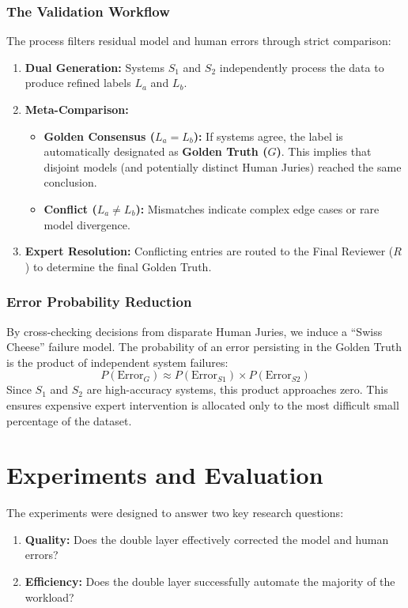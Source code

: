 \subsubsection{The Validation Workflow}
The process filters residual model and human errors through strict comparison:
\begin{enumerate}
    \item \textbf{Dual Generation:} Systems $S_1$ and $S_2$ independently process the data to produce refined labels $L_a$ and $L_b$.
    \item \textbf{Meta-Comparison:}
    \begin{itemize}
        \item \textbf{Golden Consensus ($L_a = L_b$):} If systems agree, the label is automatically designated as \textbf{Golden Truth ($G$)}. This implies that disjoint models (and potentially distinct Human Juries) reached the same conclusion.
        \item \textbf{Conflict ($L_a \neq L_b$):} Mismatches indicate complex edge cases or rare model divergence.
    \end{itemize}
    \item \textbf{Expert Resolution:} Conflicting entries are routed to the Final Reviewer ($R$) to determine the final Golden Truth.
\end{enumerate}

\subsubsection{Error Probability Reduction}
By cross-checking decisions from disparate Human Juries, we induce a ``Swiss Cheese'' failure model. The probability of an error persisting in the Golden Truth is the product of independent system failures:
\begin{equation}
    P(\text{Error}_G) \approx P(\text{Error}_{S1}) \times P(\text{Error}_{S2})
\end{equation}
Since $S_1$ and $S_2$ are high-accuracy systems, this product approaches zero. This ensures expensive expert intervention is allocated only to the most difficult small percentage of the dataset.



\section{Experiments and Evaluation}
\label{sec:experiments}

The experiments were designed to answer two key research questions:
\begin{enumerate}
    \item \textbf{Quality:} Does the double layer effectively corrected the model and human errors?
    \item \textbf{Efficiency:} Does the double layer successfully automate the majority of the workload?
\end{enumerate}

